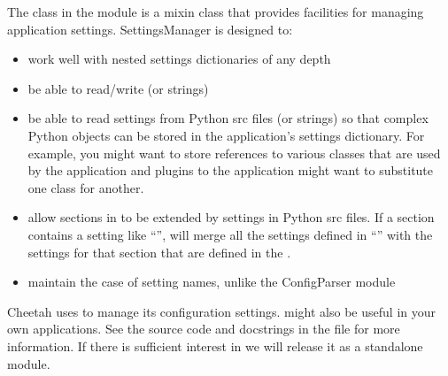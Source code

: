 The  class in the  module is
a mixin class that provides facilities for managing application settings.  
SettingsManager is designed to:
\begin{itemize}
\item work well with nested settings dictionaries of any depth
\item be able to read/write  (or strings)
\item be able to read settings from Python src files (or strings) so that
     complex Python objects can be stored in the application's settings
     dictionary.  For example, you might want to store references to various
     classes that are used by the application and plugins to the application
     might want to substitute one class for another.
\item allow sections in  to be extended by settings in
     Python src files.  If a section contains a setting like
     ``'',  will merge
     all the settings defined in ``'' with the settings for
     that section that are defined in the .
\item maintain the case of setting names, unlike the ConfigParser module
\end{itemize}

Cheetah uses  to manage its configuration settings.
 might also be useful in your own applications. See the
source code and docstrings in the file  for more
information. If there is sufficient interest in  we will
release it as a standalone module.


